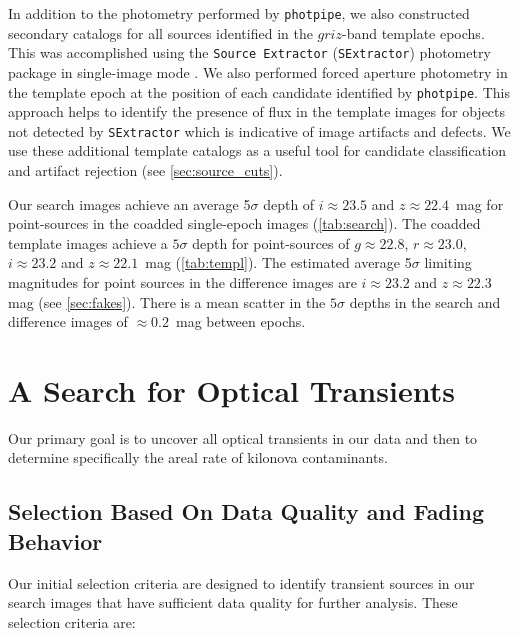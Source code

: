 In addition to the photometry performed by {\tt photpipe}, we also constructed secondary catalogs for all sources identified in the $griz$-band template epochs. This was accomplished using the {\tt Source Extractor} ({\tt SExtractor}) photometry package in single-image mode \citep{bertin96}. We also performed forced aperture photometry in the template epoch at the position of each candidate identified by {\tt photpipe}. This approach helps to identify the presence of flux in the template images for objects not detected by {\tt SExtractor} which is indicative of image artifacts and defects. We use these additional template catalogs as a useful tool for candidate classification and artifact rejection (see \autoref{sec:source_cuts}).

Our search images achieve an average 5$\sigma$ depth of $i \approx 23.5$ and $z \approx 22.4$~mag for point-sources in the coadded single-epoch images (\autoref{tab:search}). The coadded template images achieve a $5\sigma$ depth for point-sources of $g \approx 22.8$, $r \approx 23.0$, $i \approx 23.2$ and $z \approx 22.1$~mag (\autoref{tab:templ}). The estimated average 5$\sigma$ limiting magnitudes for point sources in the difference images are $i \approx 23.2$ and $z \approx 22.3$ mag (see \autoref{sec:fakes}). There is a mean scatter in the $5\sigma$ depths in the search and difference images of $\approx 0.2$~mag between epochs.


\section{A Search for Optical Transients}
\label{sec:search}

Our primary goal is to uncover all optical transients in our data and then to determine specifically the areal rate of kilonova contaminants.

\subsection{Selection Based On Data Quality and Fading Behavior}
\label{sec:data_cuts}

Our initial selection criteria are designed to identify transient sources in our search images that have sufficient data quality for further analysis. These selection criteria are:


